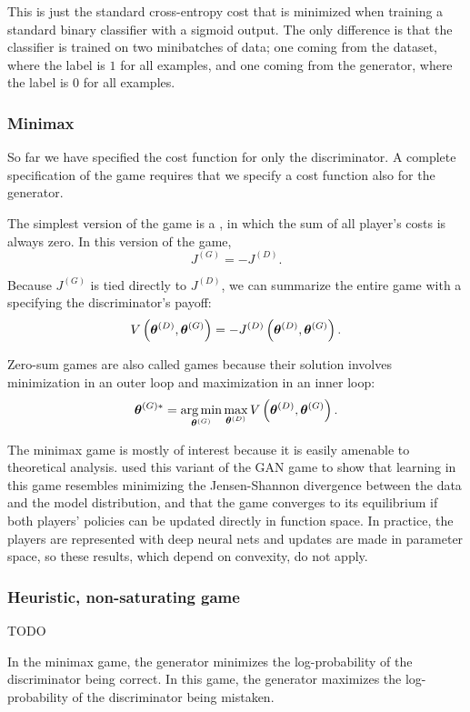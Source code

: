 This is just the standard cross-entropy cost that is minimized when training a standard binary classifier
with a sigmoid output.
The only difference is that the classifier is trained on two minibatches of data; one coming from the
dataset, where the label is $1$ for all examples, and one coming from the generator, where the label
is $0$ for all examples.


\subsubsection{Minimax}

So far we have specified the cost function for only the discriminator.
A complete specification of the game requires that we specify a cost function also
for the generator.

The simplest version of the game is a , in which the sum of all player's
costs is always zero.
In this version of the game,
\[ J^{(G)} = - J^{(D)} .\]

Because $J^{(G)}$ is tied directly to $J^{(D)}$, we can summarize the entire game with a
 specifying the discriminator's payoff:
\[ V\left({\bm{\theta}}^{(D)}, {\bm{\theta}}^{(G)} \right) = - J^{(D)} \left({\bm{\theta}}^{(D)}, {\bm{\theta}}^{(G)} \right).\]

Zero-sum games are also called  games because their solution involves minimization
in an outer loop and maximization in an inner loop:
\[ {\bm{\theta}}^{(G)*} = \operatorname*{arg\,min}_{{\bm{\theta}}^{(G)}} \max_{{\bm{\theta}}^{(D)}} V\left({\bm{\theta}}^{(D)}, {\bm{\theta}}^{(G)} \right) . \]

The minimax game is mostly of interest because it is easily amenable to theoretical analysis.
\citet{Goodfellow-et-al-NIPS2014-small} used this variant of the GAN game to show that learning in
this game resembles minimizing the Jensen-Shannon divergence between the data and the model distribution,
and that the game converges to its equilibrium if both players' policies can be updated directly in
function space.
In practice, the players are represented with deep neural nets and updates are made in parameter space,
so these results, which depend on convexity, do not apply.

\subsubsection{Heuristic, non-saturating game}

TODO

In the minimax game, the generator minimizes the log-probability of the discriminator being correct.
In this game, the generator maximizes the log-probability of the discriminator being mistaken.
